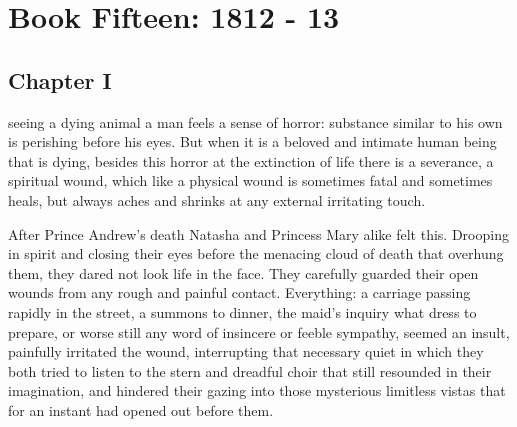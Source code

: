 \part*{Book Fifteen: 1812 - 13}


\chapter*{Chapter I} 
\ifaudio 
{}
\fi

 seeing a dying animal a man feels a sense of horror:
substance similar to his own is perishing before his eyes. But
when it is a beloved and intimate human being that is dying,
besides this horror at the extinction of life there is a
severance, a spiritual wound, which like a physical wound is
sometimes fatal and sometimes heals, but always aches and shrinks
at any external irritating touch.

After Prince Andrew's death Natasha and Princess Mary alike felt
this.  Drooping in spirit and closing their eyes before the
menacing cloud of death that overhung them, they dared not look
life in the face. They carefully guarded their open wounds from
any rough and painful contact.  Everything: a carriage passing
rapidly in the street, a summons to dinner, the maid's inquiry
what dress to prepare, or worse still any word of insincere or
feeble sympathy, seemed an insult, painfully irritated the wound,
interrupting that necessary quiet in which they both tried to
listen to the stern and dreadful choir that still resounded in
their imagination, and hindered their gazing into those
mysterious limitless vistas that for an instant had opened out
before them.

